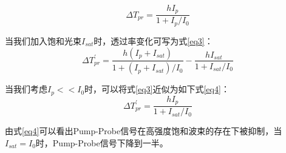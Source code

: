 \documentclass{phyasgn}\usepackage{nag}
\begin{document}
    \begin{equation}
    \Delta T_{pr}=\dfrac{hI_{p}}{1+I_{p}/I_{0}}
    \label{eq2}
    \end{equation}
    \par 当我们加入饱和光束$I_{sat}$时，透过率变化可写为式\eqref{eq3}：
    \begin{equation}
    \Delta T_{pr}^{\prime}=\dfrac{h(I_{p}+I_{sat})}{1+(I_{p}+I_{sat})/I_{0}}-\dfrac{hI_{sat}}{1+I_{sat}/I_{0}}
    \label{eq3}
    \end{equation}
    \par 当我们考虑$I_{p}<<I_{0}$时，可以将式\eqref{eq3}近似为如下式\eqref{eq4}：
    \begin{equation}
        \Delta T_{pr}^{\prime}=\dfrac{hI_{p}}{1+I_{sat}/I_{0}}
        \label{eq4}
        \end{equation}
     \par 由式\eqref{eq4}可以看出Pump-Probe信号在高强度饱和波束的存在下被抑制，当$I_{sat} = I_{0}$时，Pump-Probe信号下降到一半。
\end{document}
